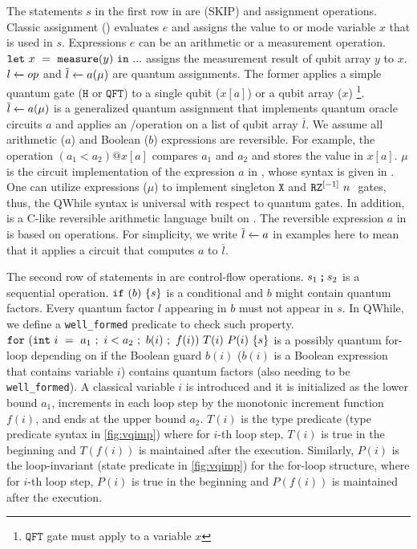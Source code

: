 The statements $s$ in the first row in  are \sskip (SKIP) and assignment operations.
Classic assignment () evaluates $e$ and assigns the value to \cmode or \qmode mode variable $x$ that is used in $s$.
Expressions $e$ can be an arithmetic or a measurement operation.
$\sexp{x}{\smea{y}}{...}$ assigns the measurement result of qubit array $y$ to $x$.
$\ssassign{l}{}{op}$ and $\ssassign{\overline{l}}{}{a(\mu)}$ are quantum assignments.
The former applies a simple quantum gate ($\texttt{H}$ or $\texttt{QFT}$)
to a single qubit ($x[a]$) or a qubit array ($x$) \footnote{$\texttt{QFT}$ gate must apply to a variable $x$}.
$\ssassign{\overline{l}}{}{a(\mu)}$ is a generalized quantum assignment that implements quantum oracle circuits $a$ and applies an \oqasm/\sourcelang operation on a list of qubit array $\overline{l}$.
We assume all arithmetic ($a$) and Boolean ($b$) expressions are reversible.
For example, the operation $(a_1 < a_2) @ x[a]$ compares $a_1$ and $a_2$ and stores the value in $x[a]$.
$\mu$ is the circuit implementation of the expression $a$ in \oqasm, whose syntax is given in .
One can utilize \oqasm expressions ($\mu$) to implement singleton $\texttt{X}$ and $\irz[\lbrack -1 \rbrack]{n}{}$ gates,
thus, the QWhile syntax is universal with respect to quantum gates.
In addition, \sourcelang is a C-like reversible arithmetic language built on \oqasm.
The reversible expression $a$ in  is based on \sourcelang operations.
For simplicity, we write $\ssassign{\overline{l}}{}{a}$ in examples here to
mean that it applies a \sourcelang circuit that computes $a$ to $\overline{l}$.

The second row of statements in  are control-flow operations.
$\sseq{s_1}{s_2}$ is a sequential operation.
$\sifq{b}{s}$ is a conditional and $b$ might contain quantum factors.
Every quantum factor $l$ appearing in $b$ must not appear in $s$.
In QWhile, we define a \texttt{well\_formed} predicate to check such property.
$\sqwhile{\sinit{i}{a_1}}{i<a_2}{b(i)}{f(i)}{T(i)}{P(i)}{s}$ is a possibly quantum for-loop depending on if the Boolean guard $b(i)$ ($b(i)$ is a Boolean expression that contains variable $i$) contains quantum factors (also needing to be \texttt{well\_formed}).
A classical variable $i$ is introduced and it is initialized as the lower bound $a_1$, increments in each loop step by the monotonic increment function $f(i)$, and ends at the upper bound $a_2$.
$T(i)$ is the type predicate (type predicate syntax in \cref{fig:vqimp}) where for $i$-th loop step,
$T(i)$ is true in the beginning and $T(f(i))$ is maintained after the execution.
Similarly, $P(i)$ is the loop-invariant (state predicate in \cref{fig:vqimp}) for the for-loop structure, where for $i$-th loop step,
$P(i)$ is true in the beginning and $P(f(i))$ is maintained after the execution. 

